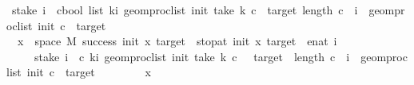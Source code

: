 \begin{isabellebody}
{\isacharequal}{\kern0pt}\ stake\ i\ {\isacharminus}{\kern0pt}{\isacharbackquote}{\kern0pt}\ {\isacharbraceleft}{\kern0pt}c{\isacharcolon}{\kern0pt}{\isacharcolon}{\kern0pt}bool\ list{\isachardot}{\kern0pt}\ {\isacharparenleft}{\kern0pt}{\isasymforall}k{\isacharless}{\kern0pt}i{\isachardot}{\kern0pt}\ {\isacharparenleft}{\kern0pt}geom{\isacharunderscore}{\kern0pt}proc{\isacharunderscore}{\kern0pt}list\ init\ {\isacharparenleft}{\kern0pt}take\ k\ c{\isacharparenright}{\kern0pt}{\isacharparenright}{\kern0pt}\ {\isasymnotin}\ {\isacharbraceleft}{\kern0pt}{}{\isacharcomma}{\kern0pt}target{\isacharbraceright}{\kern0pt}{\isacharparenright}{\kern0pt}{\isasymand}\ length\ c\ {\isacharequal}{\kern0pt}\ i\ {\isasymand}\ geom{\isacharunderscore}{\kern0pt}proc{\isacharunderscore}{\kern0pt}list\ init\ c\ {\isacharequal}{\kern0pt}\ target{\isacharbraceright}{\kern0pt}{\isachardoublequoteclose}\isanewline
%
\isadelimproof
%
\endisadelimproof
%
\isatagproof
{}\isamarkupfalse%
\isanewline
\ \ \isamarkupfalse%
\ {\isachardoublequoteopen}\ {\isacharbraceleft}{\kern0pt}x\ {\isasymin}\ space\ M{\isachardot}{\kern0pt}\ success\ {\isacharparenleft}{\kern0pt}init{\isacharparenright}{\kern0pt}\ x\ {\isacharparenleft}{\kern0pt}target{\isacharparenright}{\kern0pt}\ {\isasymand}\ stop{\isacharunderscore}{\kern0pt}at\ {\isacharparenleft}{\kern0pt}init{\isacharparenright}{\kern0pt}\ x\ {\isacharparenleft}{\kern0pt}target{\isacharparenright}{\kern0pt}\ {\isacharequal}{\kern0pt}\ enat\ i{\isacharbraceright}{\kern0pt}\isanewline
\ \ \ \ {\isasymsubseteq}\ stake\ i\ {\isacharminus}{\kern0pt}{\isacharbackquote}{\kern0pt}\ {\isacharbraceleft}{\kern0pt}c{\isachardot}{\kern0pt}\ {\isacharparenleft}{\kern0pt}{\isasymforall}k{\isacharless}{\kern0pt}i{\isachardot}{\kern0pt}\ geom{\isacharunderscore}{\kern0pt}proc{\isacharunderscore}{\kern0pt}list\ {\isacharparenleft}{\kern0pt}init{\isacharparenright}{\kern0pt}\ {\isacharparenleft}{\kern0pt}take\ k\ c{\isacharparenright}{\kern0pt}\ {\isasymnotin}\ {\isacharbraceleft}{\kern0pt}{}{\isacharcomma}{\kern0pt}\ target{\isacharbraceright}{\kern0pt}{\isacharparenright}{\kern0pt}\ {\isasymand}\ length\ c\ {\isacharequal}{\kern0pt}\ i\ {\isasymand}\ geom{\isacharunderscore}{\kern0pt}proc{\isacharunderscore}{\kern0pt}list\ {\isacharparenleft}{\kern0pt}init{\isacharparenright}{\kern0pt}\ c\ {\isacharequal}{\kern0pt}\ target{\isacharbraceright}{\kern0pt}{\isachardoublequoteclose}\isanewline
\ \ \isamarkupfalse%
\isanewline
\ \ \ \ \isamarkupfalse%
\ x\isanewline
\ \ \ \ \isamarkupfalse%

\end{isabellebody}
